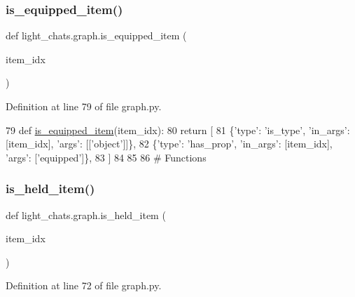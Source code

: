 \subsubsection{\texorpdfstring{is\+\_\+equipped\+\_\+item()}{is\_equipped\_item()}}
{\footnotesize\ttfamily def light\+\_\+chats.\+graph.\+is\+\_\+equipped\+\_\+item (\begin{DoxyParamCaption}\item[{}]{item\+\_\+idx }\end{DoxyParamCaption})}



Definition at line 79 of file graph.\+py.


\begin{DoxyCode}
79 \textcolor{keyword}{def }\hyperlink{namespacelight__chats_1_1graph_a76960b89046df1b0cda1de931fa1fd69}{is\_equipped\_item}(item\_idx):
80     \textcolor{keywordflow}{return} [
81         \{\textcolor{stringliteral}{'type'}: \textcolor{stringliteral}{'is\_type'}, \textcolor{stringliteral}{'in\_args'}: [item\_idx], \textcolor{stringliteral}{'args'}: [[\textcolor{stringliteral}{'object'}]]\},
82         \{\textcolor{stringliteral}{'type'}: \textcolor{stringliteral}{'has\_prop'}, \textcolor{stringliteral}{'in\_args'}: [item\_idx], \textcolor{stringliteral}{'args'}: [\textcolor{stringliteral}{'equipped'}]\},
83     ]
84 
85 
86 \textcolor{comment}{# Functions}
\end{DoxyCode}
\mbox{\label{namespacelight__chats_1_1graph_aa0be6ee7e9f549a7195bea9dfb962ad6}} 
\subsubsection{\texorpdfstring{is\+\_\+held\+\_\+item()}{is\_held\_item()}}
{\footnotesize\ttfamily def light\+\_\+chats.\+graph.\+is\+\_\+held\+\_\+item (\begin{DoxyParamCaption}\item[{}]{item\+\_\+idx }\end{DoxyParamCaption})}



Definition at line 72 of file graph.\+py.


